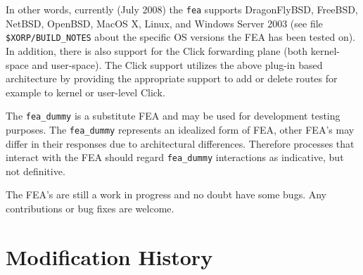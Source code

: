 \documentclass[11pt]{article}
\begin{document}
In other words, currently (July 2008) the {\tt fea} supports DragonFlyBSD,
FreeBSD, NetBSD, OpenBSD, MacOS X, Linux, and Windows Server 2003 (see file
{\tt  \$XORP/BUILD\_NOTES} about the specific OS versions the FEA has
been tested on).
In addition, there is also support for the Click forwarding plane
(both kernel-space and user-space). The Click support utilizes the
above plug-in based architecture by providing the appropriate support
to add or delete routes for example to kernel or user-level Click.

The {\tt fea\_dummy} is a substitute FEA and may be
used for development testing purposes.  The {\tt fea\_dummy}
represents an idealized form of FEA, other FEA's may differ in their
responses due to architectural differences.  Therefore processes that
interact with the FEA should regard {\tt fea\_dummy} interactions as
indicative, but not definitive.

The FEA's are still a work in progress and no doubt have some bugs.
Any contributions or bug fixes are welcome.

\appendix
\section{Modification History}
\end{document}

